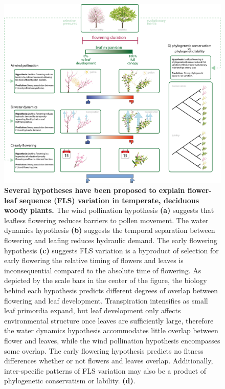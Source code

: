 \documentclass[11pt]{article}
\begin{document}
\begin{figure}[h!]
    \centering
 \includegraphics[width=\textwidth]{..//HarvardForest/concept_hystheranty_wide_text_overlaps.png} 
    \caption{\textbf{Several hypotheses have been proposed to explain flower-leaf sequence (FLS) variation in temperate, deciduous woody plants.}  The wind pollination hypothesis \textbf{(a)} suggests that leafless flowering reduces barriers to pollen movement. The water dynamics hypothesis \textbf{(b)} suggests the temporal separation between flowering and leafing reduces hydraulic demand. The early flowering hypothesis \textbf{(c)} suggests FLS variation is a byproduct of selection for early flowering the relative timing of flowers and leaves is inconsequential compared to the absolute time of flowering. As depicted by the scale bars in the center of the figure, the biology behind each hypothesis predicts different degrees of overlap between flowering and leaf development. Transpiration intensifies as small leaf primordia expand, but leaf development only affects environmental structure once leaves are sufficiently large, therefore the water dynamics hypothesis accommodates little overlap between flower and leaves, while the wind pollination hypothesis encompasses some overlap. The early flowering hypothesis predicts no fitness differences whether or not flowers and leaves overlap. Additionally, inter-specific patterns of FLS variation may also be a product of phylogenetic conservatism or lability. \textbf{(d)}.}
    \label{fig:conceptual}
\end{figure}
 
\end{document}

